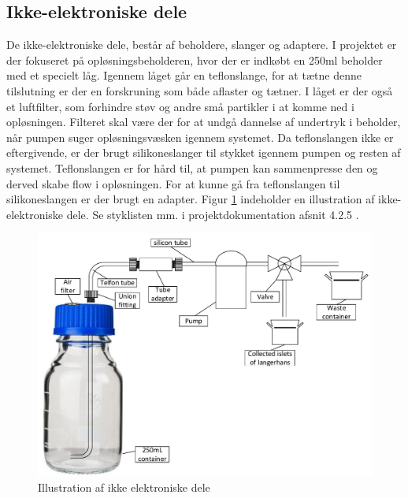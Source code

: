 \newpage
\subsection{Ikke-elektroniske dele}
De ikke-elektroniske dele, består af beholdere, slanger og adaptere. I projektet er der fokuseret på opløsningsbeholderen, hvor der er indkøbt en 250ml beholder med et specielt låg. Igennem låget går en teflonslange, for at tætne denne tilslutning er der en forskruning som både aflaster og tætner. I låget er der også et luftfilter, som forhindre støv og andre små partikler i at komme ned i opløsningen. Filteret skal være der for at undgå dannelse af undertryk i beholder, når pumpen suger opløsningsvæsken igennem systemet. Da teflonslangen ikke er eftergivende, er der brugt silikoneslanger til stykket igennem pumpen og resten af systemet. Teflonslangen er for hård til, at pumpen kan sammenpresse den og derved skabe flow i opløsningen. For at kunne gå fra teflonslangen til silikoneslangen er der brugt en adapter. Figur \ref{fig:nonelectronic} indeholder en illustration af ikke-elektroniske dele. Se styklisten mm. i projektdokumentation afsnit 4.2.5 .

\begin{figure}[H]
	\centering
	\includegraphics[width=1\textwidth]{billeder/Hovedrapport/ikkeelektronisk.pdf}
	\caption{Illustration af ikke elektroniske dele}
	\label{fig:nonelectronic}
\end{figure}


